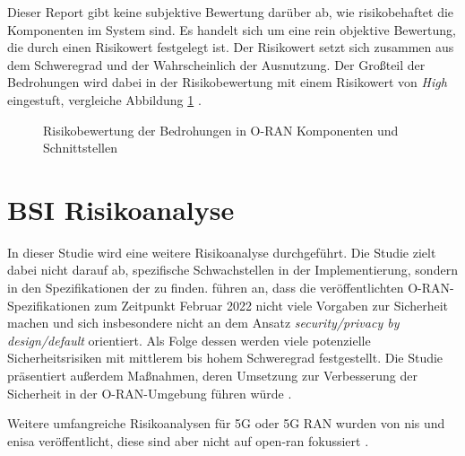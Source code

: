 \par Dieser Report gibt keine subjektive Bewertung darüber ab, wie risikobehaftet die Komponenten im System sind. Es handelt sich um eine rein objektive Bewertung, die durch einen Risikowert festgelegt ist. Der Risikowert setzt sich zusammen aus dem Schweregrad und der Wahrscheinlich der Ausnutzung. Der Großteil der Bedrohungen wird dabei in der Risikobewertung mit einem Risikowert von \textit{High} eingestuft, vergleiche Abbildung \ref{fig:riskscore-oran-components} \autocite{o-ranworkgroup11securityworkgroupORANSecurityThreat2024}.
%
\begin{figure}[H]
    \centering
    \label{fig:riskscore-oran-components}
    \caption{Risikobewertung der Bedrohungen in O-RAN Komponenten und Schnittstellen}
\end{figure}
%

\section{BSI Risikoanalyse}
\label{sec:forschungsstand-bsi}
In dieser Studie wird eine weitere Risikoanalyse durchgeführt. Die Studie zielt dabei nicht darauf ab, spezifische Schwachstellen in der Implementierung, sondern in den Spezifikationen der \orana zu finden. \citeauthor{kopsellOpenRANRisikoanalyse2022} führen an, dass die veröffentlichten O-RAN-Spezifikationen zum Zeitpunkt Februar 2022 nicht viele Vorgaben zur Sicherheit machen und sich insbesondere nicht an dem Ansatz \textit{security/privacy by design/default} orientiert. Als Folge dessen werden viele potenzielle Sicherheitsrisiken mit mittlerem bis hohem Schweregrad festgestellt. Die Studie präsentiert außerdem Maßnahmen, deren Umsetzung zur Verbesserung der Sicherheit in der O-RAN-Umgebung führen würde \autocite{kopsellOpenRANRisikoanalyse2022}.
\par Weitere umfangreiche Risikoanalysen für 5G oder 5G RAN wurden von \gls{nis} und \gls{enisa} veröffentlicht, diese sind aber nicht auf \gls{open-ran} fokussiert \autocite{europeanunionagencyfornetworkandinformationsecurity.ENISAThreatLandscape2019,EUCoordinatedRisk2019}.
%

